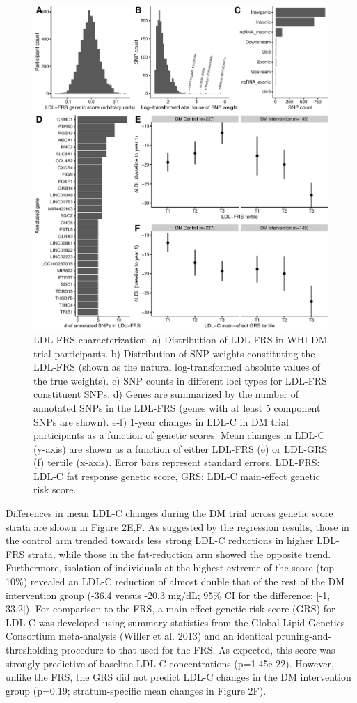 \documentclass[]{article}
\begin{document}
\begin{figure}
\centering
\includegraphics{figures/ldl-score-characterization-1.pdf}
\caption{LDL-FRS characterization. a) Distribution of LDL-FRS in WHI DM
trial participants. b) Distribution of SNP weights constituting the
LDL-FRS (shown as the natural log-transformed absolute values of the
true weights). c) SNP counts in different loci types for LDL-FRS
constituent SNPs. d) Genes are summarized by the number of annotated
SNPs in the LDL-FRS (genes with at least 5 component SNPs are shown).
e-f) 1-year changes in LDL-C in DM trial participants as a function of
genetic scores. Mean changes in LDL-C (y-axis) are shown as a function
of either LDL-FRS (e) or LDL-GRS (f) tertile (x-axis). Error bars
represent standard errors. LDL-FRS: LDL-C fat response genetic score,
GRS: LDL-C main-effect genetic risk score.}
\end{figure}

Differences in mean LDL-C changes during the DM trial across genetic
score strata are shown in Figure 2E,F. As suggested by the regression
results, those in the control arm trended towards less strong LDL-C
reductions in higher LDL-FRS strata, while those in the fat-reduction
arm showed the opposite trend. Furthermore, isolation of individuals at
the highest extreme of the score (top 10\%) revealed an LDL-C reduction
of almost double that of the rest of the DM intervention group (-36.4
versus -20.3 mg/dL; 95\% CI for the difference: {[}-1, 33.2{]}). For
comparison to the FRS, a main-effect genetic risk score (GRS) for LDL-C
was developed using summary statistics from the Global Lipid Genetics
Consortium meta-analysis (Willer et al. 2013) and an identical
pruning-and-thresholding procedure to that used for the FRS. As
expected, this score was strongly predictive of baseline LDL-C
concentrations (p=1.45e-22). However, unlike the FRS, the GRS did not
predict LDL-C changes in the DM intervention group (p=0.19;
stratum-specific mean changes in Figure 2F).
\end{document}
